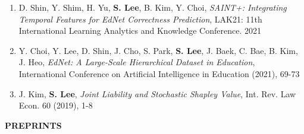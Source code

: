 \documentclass[letterpaper,11pt]{article}
\newcommand{\resheading}[1]{%
  \par\addvspace{10pt}%
  {\sffamily\bfseries\large\color{accent}\MakeUppercase{#1}}\par\nobreak
  \vspace{2pt}{\color{accent!35}\hrule height 0.7pt}\par\nobreak\vspace{5pt}}
\begin{document}
\begin{itemize}
\begin{enumerate}
		\item D. Shin, Y. Shim, H. Yu, \textbf{S. Lee}, B. Kim, Y. Choi, \emph{SAINT+: Integrating Temporal Features for EdNet Correctness Prediction}, LAK21: 11th International Learning Analytics and Knowledge Conference. 2021
		\item Y. Choi, Y. Lee, D. Shin, J. Cho, S. Park, \textbf{S. Lee}, J. Baek, C. Bae, B. Kim, J. Heo, \emph{EdNet: A Large-Scale Hierarchical Dataset in Education}, International Conference on Artificial Intelligence in Education (2021), 69-73
		\item J. Kim, \textbf{S. Lee}, \emph{Joint Liability and Stochastic Shapley Value}, Int. Rev. Law Econ. 60 (2019), 1-8
	\end{enumerate}
\end{itemize}

\resheading{Preprints}
\end{document}
